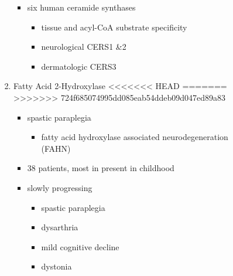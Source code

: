 \documentclass[fontsize=12pt]{scrartcl}
\begin{document}
\begin{enumerate}
\begin{enumerate}
\begin{enumerate}
\begin{enumerate}
\begin{enumerate}
\begin{itemize}
\item six human ceramide synthases
\begin{itemize}
\item tissue and acyl-CoA substrate specificity
\item neurological CERS1 \&2
\item dermatologic CERS3
\end{itemize}
\end{itemize}

\item Fatty Acid 2-Hydroxylase
<<<<<<< HEAD
\label{sec:org23645cf}
=======
\label{sec:org9b26de1}
>>>>>>> 724f685074995dd085eab54ddeb09d047ed89a83
\begin{itemize}
\item spastic paraplegia
\begin{itemize}
\item fatty acid hydroxylase associated neurodegeneration (FAHN)
\end{itemize}
\item 38 patients, most in present in childhood
\item slowly progressing
\begin{itemize}
\item spastic paraplegia
\item dysarthria
\item mild cognitive decline
\item dystonia
\end{itemize}


\end{itemize}
\end{enumerate}
\end{enumerate}
\end{enumerate}
\end{enumerate}
\end{enumerate}
\end{document}
